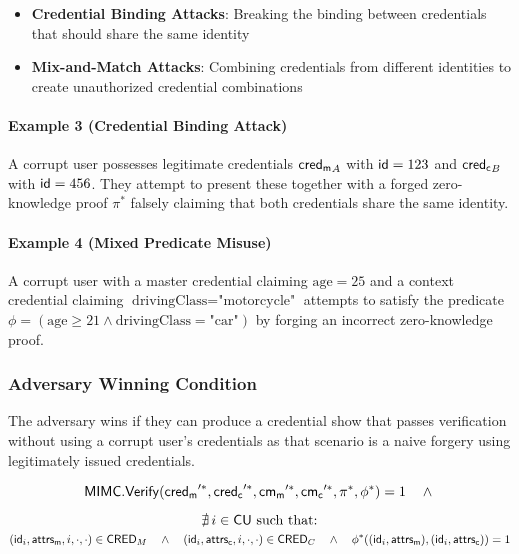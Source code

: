 \begin{itemize}
    \item \textbf{Credential Binding Attacks}: Breaking the binding between credentials that should share the same identity
    \item \textbf{Mix-and-Match Attacks}: Combining credentials from different identities to create unauthorized credential combinations
\end{itemize}

\paragraph{Example 3 (Credential Binding Attack)} A corrupt user possesses legitimate credentials $\mathsf{cred_m}_A$ with $\mathsf{id}=123$ and $\mathsf{cred_c}_B$ with $\mathsf{id}=456$. They attempt to present these together with a forged zero-knowledge proof $\pi^*$ falsely claiming that both credentials share the same identity.

\paragraph{Example 4 (Mixed Predicate Misuse)} A corrupt user with a master credential claiming $\text{age}=25$ and a context credential claiming $\text{drivingClass}=\text{"motorcycle"}$ attempts to satisfy the predicate $\phi=(\text{age} \geq 21 \land \text{drivingClass} = \text{"car"})$ by forging an incorrect zero-knowledge proof.

\subsubsection{Adversary Winning Condition}
The adversary wins if they can produce a credential show that passes verification without using a corrupt user's credentials as that scenario is a naive forgery using legitimately issued credentials. 

\[
\mathsf{MIMC.Verify}(\mathsf{cred_m}'^*, \mathsf{cred_c}'^*, \mathsf{cm_m}'^*, \mathsf{cm_c}'^*, \pi^*, \phi^*) = 1 \quad \wedge\\
\]


\[
      \nexists\, i \in \mathsf{CU} \text{ such that:}\\
\]
\[
(\mathsf{id}_i, \mathsf{attrs_m}, i, \cdot, \cdot) \in \mathsf{CRED}_M \quad \wedge \quad (\mathsf{id}_i, \mathsf{attrs_c}, i, \cdot, \cdot) \in \mathsf{CRED}_C \quad \wedge \quad \phi^*((\mathsf{id}_i, \mathsf{attrs_m}), (\mathsf{id}_i, \mathsf{attrs_c})) = 1
\]

